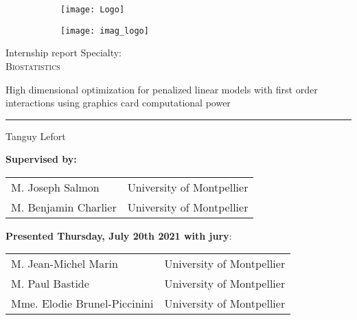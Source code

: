\documentclass[a4paper, twoside]{memoir}
\begin{document}
\begin{titlingpage}
    \begin{figure}
        \begin{subfigure}{.45\paperwidth}
    \texttt{[image: Logo]}
        \end{subfigure}
    \hfill
        \begin{subfigure}{.45\paperwidth}
    \texttt{[image: imag\_logo]}
        \end{subfigure}
    \end{figure}
        \vspace{1cm}
    \begin{center}
        Internship report \vspace{.5cm} Specialty: \\ {\scshape Biostatistics}
    \end{center} \vspace{2cm}
     \huge {\bfseries \begin{center}
        High dimensional optimization for penalized
        linear models with first order interactions using graphics card
        computational power
    \end{center} \hrule }
    \begin{flushright} Tanguy Lefort \end{flushright}
    \vspace{1cm}
    \normalsize
    \textbf{Supervised by:}
      \begin{center}
         \begin{tabular}{ll  }
              M. Joseph Salmon & University of Montpellier\\
              M. Benjamin Charlier & University of Montpellier\\
         \end{tabular}
        \end{center}
    \normalsize\vspace{2cm} \textbf{Presented Thursday, July 20th 2021 with jury}:
    \begin{center}
        \begin{tabular}{ll}
            M. Jean-Michel Marin & University of Montpellier \\
            M. Paul Bastide & University of Montpellier \\
            Mme. Elodie Brunel-Piccinini & University of Montpellier \\
        \end{tabular}
    \end{center}
\end{titlingpage}
\end{document}
